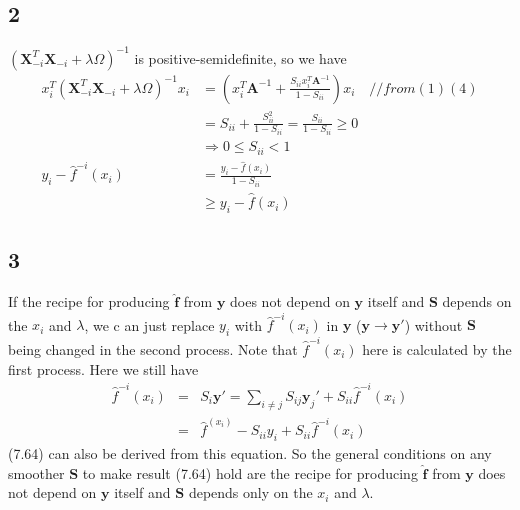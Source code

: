 \documentclass[11pt, oneside]{article}   	%
\begin{document}
\subsection{2}

\noindent
$(\mathbf{X}^T_{-i}\mathbf{X}_{-i}+\lambda\Omega)^{-1}$ is positive-semidefinite, so we have 
\begin{equation}
\begin{split}
x_i^T(\mathbf{X}^T_{-i}\mathbf{X}_{-i}+\lambda\Omega)^{-1}x_i&=\left( x_i^T\mathbf{A}^{-1}+\frac{S_{ii}x_i^T\mathbf{A}^{-1}}{1-S_{ii}}\right)x_i\quad //from(1)(4) \\
&= S_{ii}+\frac{S_{ii}^2}{1-S_{ii}}=\frac{S_{ii}}{1-S_{ii}}\ge0 \\
&\Rightarrow 0\le S_{ii}<1 \\
y_i-\hat{f}^{-i}(x_i)&=\frac{y_i-\hat{f}(x_i)}{1-S_{ii}} \\
&\ge y_i-\hat{f}(x_i)
\end{split}
\end{equation}

\subsection{3}
If the recipe for producing $\hat{\mathbf{f}}$ from $\mathbf{y}$ does not depend on $\mathbf{y}$ itself and  $\mathbf{S}$ depends on the  $x_i$ and $\lambda$, we c an just replace $y_i$ with $\hat{f}^{-i}(x_i)$ in $\mathbf{y}$ ($\mathbf{y} \to \mathbf{y}'$) without $\mathbf{S}$ being changed in the second process. Note that $\hat{f}^{-i}(x_i)$ here is calculated by the first process. Here we still have 
\begin{eqnarray}
\hat{f}^{-i}(x_i) &=& S_i \mathbf{y'} = \sum_{i \ne j} S_{ij} \mathbf{y}_j'+ S_{ii} \hat{f}^{-i}(x_i) \nonumber \\
&=& \hat{f}^(x_i) - S_{ii} y_i +  S_{ii} \hat{f}^{-i}(x_i) \nonumber
\end{eqnarray}
(7.64) can also be derived from this equation. So the general conditions on any smoother $\mathbf{S}$ to make result (7.64) hold are the recipe for producing $\hat{\mathbf{f}}$ from $\mathbf{y}$ does not depend on $\mathbf{y}$ itself and $\mathbf{S}$ depends only on the $x_i$ and $\lambda$.
\end{document}
